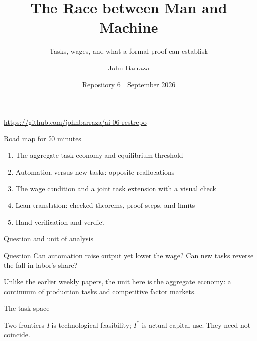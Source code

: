 \documentclass[aspectratio=169,11pt]{beamer}
\title{The Race between Man and Machine}
\subtitle{Tasks, wages, and what a formal proof can establish}
\author{John Barraza}
\date{Repository 6 \quad | \quad September 2026}
\begin{document}
\begin{frame}
\titlepage
\centering\small\url{https://github.com/johnbarraza/ai-06-restrepo}
\end{frame}

\begin{frame}{Road map for 20 minutes}
\begin{enumerate}
\item The aggregate task economy and equilibrium threshold
\item Automation versus new tasks: opposite reallocations
\item The wage condition and a joint task extension with a visual check
\item Lean translation: checked theorems, proof steps, and limits
\item Hand verification and verdict
\end{enumerate}
\end{frame}

\begin{frame}{Question and unit of analysis}
\begin{block}{Question}
Can automation raise output yet lower the wage? Can new tasks reverse the fall in labor's share?
\end{block}
\vspace{.5em}
Unlike the earlier weekly papers, the unit here is the \alert{aggregate economy}: a continuum of production tasks and competitive factor markets.
\end{frame}

\begin{frame}{The task space}
\centering
{}
\vspace{1em}
\begin{block}{Two frontiers}
$I$ is technological feasibility; $I^*$ is actual capital use. They need not coincide.
\end{block}
\end{frame}
\end{document}
